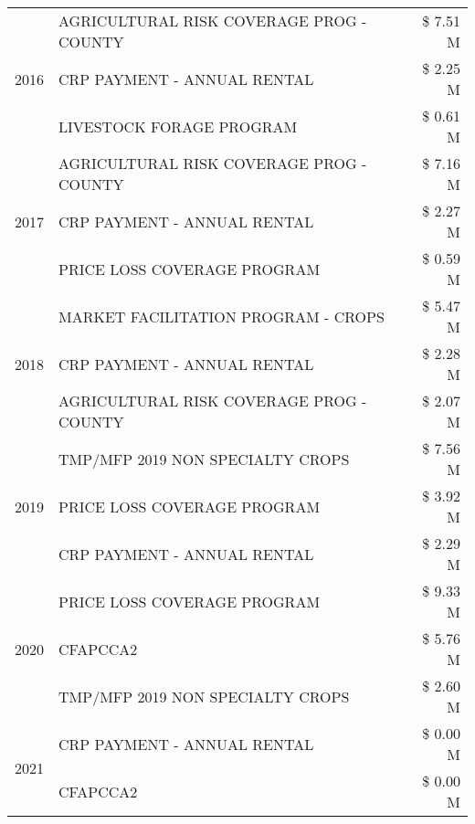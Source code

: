 \begin{tabular}{llr}
\cline{1-3}
\multirow[t]{3}{*}{2016} & AGRICULTURAL RISK COVERAGE PROG - COUNTY & \$ 7.51 M \\
 & CRP PAYMENT - ANNUAL RENTAL & \$ 2.25 M \\
 & LIVESTOCK FORAGE PROGRAM & \$ 0.61 M \\
\cline{1-3}
\multirow[t]{3}{*}{2017} & AGRICULTURAL RISK COVERAGE PROG - COUNTY & \$ 7.16 M \\
 & CRP PAYMENT - ANNUAL RENTAL & \$ 2.27 M \\
 & PRICE LOSS COVERAGE PROGRAM & \$ 0.59 M \\
\cline{1-3}
\multirow[t]{3}{*}{2018} & MARKET FACILITATION PROGRAM - CROPS & \$ 5.47 M \\
 & CRP PAYMENT - ANNUAL RENTAL & \$ 2.28 M \\
 & AGRICULTURAL RISK COVERAGE PROG - COUNTY & \$ 2.07 M \\
\cline{1-3}
\multirow[t]{3}{*}{2019} & TMP/MFP 2019 NON SPECIALTY CROPS & \$ 7.56 M \\
 & PRICE LOSS COVERAGE PROGRAM & \$ 3.92 M \\
 & CRP PAYMENT - ANNUAL RENTAL & \$ 2.29 M \\
\cline{1-3}
\multirow[t]{3}{*}{2020} & PRICE LOSS COVERAGE PROGRAM & \$ 9.33 M \\
 & CFAPCCA2 & \$ 5.76 M \\
 & TMP/MFP 2019 NON SPECIALTY CROPS & \$ 2.60 M \\
\cline{1-3}
\multirow[t]{2}{*}{2021} & CRP PAYMENT - ANNUAL RENTAL & \$ 0.00 M \\
 & CFAPCCA2 & \$ 0.00 M \\
\cline{1-3}
\bottomrule
\end{tabular}
